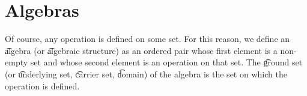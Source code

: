 \section*{Algebras}

Of course, any operation is defined on some set.
For this reason, we define an \t{algebra} (or \t{algebraic structure}) as an ordered pair whose first element is a non-empty set and whose second element is an operation on that set.
The \t{ground set} (or \t{underlying set}, \t{carrier set}, \t{domain}) of the algebra is the set on which the operation is defined.
